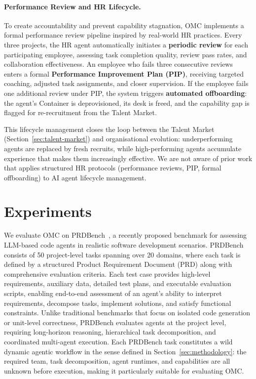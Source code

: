 \documentclass[11pt,a4paper]{article}
\begin{document}
\paragraph{Performance Review and HR Lifecycle.} To create accountability and prevent capability stagnation, OMC implements a formal performance review pipeline inspired by real-world HR practices.  Every three projects, the HR agent automatically initiates a \textbf{periodic review} for each participating employee, assessing task completion quality, review pass rates, and collaboration effectiveness.  An employee who fails three consecutive reviews enters a formal \textbf{Performance Improvement Plan (PIP)}, receiving targeted coaching, adjusted task assignments, and closer supervision.  If the employee fails one additional review under PIP, the system triggers \textbf{automated offboarding}: the agent's Container is deprovisioned, its desk is freed, and the capability gap is flagged for re-recruitment from the Talent Market.

This lifecycle management closes the loop between the Talent Market (Section~\ref{sec:talent-market}) and organisational evolution: underperforming agents are replaced by fresh recruits, while high-performing agents accumulate experience that makes them increasingly effective.  We are not aware of prior work that applies structured HR protocols (performance reviews, PIP, formal offboarding) to AI agent lifecycle management.


\section{Experiments}
\label{sec:experiments}

We evaluate OMC on PRDBench~\cite{fu2025prdbench}, a recently proposed benchmark for assessing LLM-based code agents in realistic software development scenarios.  PRDBench consists of 50 project-level tasks spanning over 20 domains, where each task is defined by a structured Product Requirement Document (PRD) along with comprehensive evaluation criteria.  Each test case provides high-level requirements, auxiliary data, detailed test plans, and executable evaluation scripts, enabling end-to-end assessment of an agent’s ability to interpret requirements, decompose tasks, implement solutions, and satisfy functional constraints.  Unlike traditional benchmarks that focus on isolated code generation or unit-level correctness, PRDBench evaluates agents at the project level, requiring long-horizon reasoning, hierarchical task decomposition, and coordinated multi-agent execution. Each PRDBench task constitutes a wild dynamic agentic workflow in the sense defined in Section~\ref{sec:methodology}: the required team, task decomposition, agent runtimes, and capabilities are all unknown before execution, making it particularly suitable for evaluating OMC.
\end{document}

